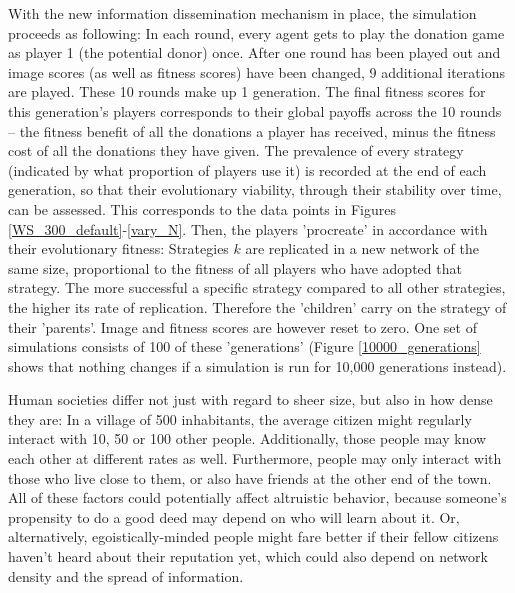 \documentclass{JASSS}
\begin{document}
With the new information dissemination mechanism in place, the simulation proceeds as following: In each round, every agent gets to play the donation game as player 1 (the potential donor) once. After one round has been played out and image scores (as well as fitness scores) have been changed, 9 additional iterations are played. These 10 rounds make up 1 generation. The final fitness scores for this generation's players corresponds to their global payoffs across the 10 rounds -- the fitness benefit of all the donations a player has received, minus the fitness cost of all the donations they have given. The prevalence of every strategy (indicated by what proportion of players use it) is recorded at the end of each generation, so that their evolutionary viability, through their stability over time, can be assessed. This corresponds to the data points in Figures \ref{WS_300_default}-\ref{vary_N}. Then, the players 'procreate' in accordance with their evolutionary fitness: Strategies $k$ are replicated in a new network of the same size, proportional to the fitness of all players who have adopted that strategy. The more successful a specific strategy compared to all other strategies, the higher its rate of replication. Therefore the 'children' carry on the strategy of their 'parents'. Image and fitness scores are however reset to zero. One set of simulations consists of 100 of these 'generations' (Figure \ref{10000_generations} shows that nothing changes if a simulation is run for 10,000 generations instead).

Human societies differ not just with regard to sheer size, but also in how dense they are: In a village of 500 inhabitants, the average citizen might regularly interact with 10, 50 or 100 other people. Additionally, those people may know each other at different rates as well. Furthermore, people may only interact with those who live close to them, or also have friends at the other end of the town. All of these factors could potentially affect altruistic behavior, because someone's propensity to do a good deed may depend on who will learn about it. Or, alternatively, egoistically-minded people might fare better if their fellow citizens haven't heard about their reputation yet, which could also depend on network density and the spread of information.
\end{document}

